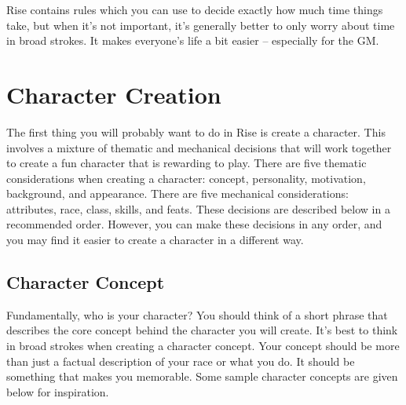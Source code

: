 Rise contains rules which you can use to decide exactly how much time things take, but when it's not important, it's generally better to only worry about time in broad strokes.
It makes everyone's life a bit easier -- especially for the GM.

\section{Character Creation}

The first thing you will probably want to do in Rise is create a character.
This involves a mixture of thematic and mechanical decisions that will work together to create a fun character that is rewarding to play.
There are five thematic considerations when creating a character: concept, personality, motivation, background, and appearance.
There are five mechanical considerations: attributes, race, class, skills, and feats.
These decisions are described below in a recommended order.
However, you can make these decisions in any order, and you may find it easier to create a character in a different way.  

\subsection{Character Concept}

Fundamentally, who is your character?
You should think of a short phrase that describes the core concept behind the character you will create.
It's best to think in broad strokes when creating a character concept.
Your concept should be more than just a factual description of your race or what you do.
It should be something that makes you memorable.
Some sample character concepts are given below for inspiration.

